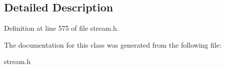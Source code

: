 \subsection{Detailed Description}


Definition at line 575 of file stream.\+h.



The documentation for this class was generated from the following file\+:\begin{DoxyCompactItemize}
\item 
stream.\+h\end{DoxyCompactItemize}

